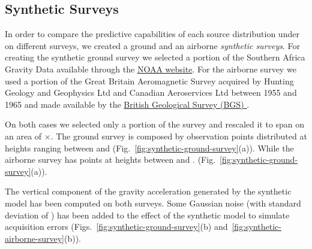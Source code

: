 \documentclass[twocolumn]{article}
\begin{document}
\subsection{Synthetic Surveys}

In order to compare the predictive capabilities of each source distribution
under on different surveys, we created a ground and an airborne \emph{synthetic
surveys}.
For creating the synthetic ground survey we selected a portion of the Southern
Africa Gravity Data available through the
\href{https://www.ngdc.noaa.gov/mgg/gravity/gravity.html}{NOAA website}.
For the airborne survey we used a portion of the Great Britain Aeromagnetic
Survey acquired by Hunting Geology and Geophysics Ltd and Canadian Aeroservices
Ltd between 1955 and 1965 and made available by the
\href{https://www.bgs.ac.uk/products/geophysics/aeromagneticRegional.html}{
British Geological Survey (BGS)
}.

On both cases we selected only a portion of the survey and rescaled it to span
on an area of \SurveyEasting{}$\times$\SurveyNorthing{}.
The ground survey is composed by \GroundSurveyPoints{} observation points
distributed at heights ranging between \GroundSurveyMinHeight{} and
\GroundSurveyMaxHeight{} (Fig.~\ref{fig:synthetic-ground-survey}(a)).
While the airborne survey has \AirborneSurveyPoints{} points at heights between
\AirborneSurveyMinHeight{} and \AirborneSurveyMaxHeight{}.
(Fig.~\ref{fig:synthetic-ground-survey}(a)).

The vertical component of the gravity acceleration generated by the synthetic
model has been computed on both surveys.
Some Gaussian noise (with standard deviation of \SurveyNoise{}) has been added
to the effect of the synthetic model to simulate acquisition errors
(Figs.~\ref{fig:synthetic-ground-survey}(b)
and~\ref{fig:synthetic-airborne-survey}(b)).
\end{document}
